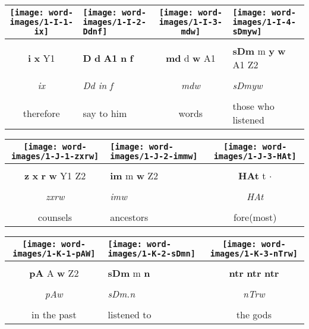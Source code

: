 \begin{tabularx}{\linewidth}{cYcY}
	\hspace*{-2mm}\texttt{[image: word-images/1-I-1-ix]} &
	\hspace*{-15mm} \texttt{[image: word-images/1-I-2-Ddnf]} &
	\hspace*{-13mm}\texttt{[image: word-images/1-I-3-mdw]} &
	\hspace*{-6mm} \texttt{[image: word-images/1-I-4-sDmyw]} \\
	\hline \\ 
	\textbf{i} \textbf{x} Y1 &
	\hspace*{-4mm} \textbf{D} \textbf{d} \textbf{A1} \textbf{n} \textbf{f} &
	\textbf{md} d \textbf{w} A1 &
	\textbf{sDm} m \textbf{y} \textbf{w} A1 Z2 \\
	\hline \\ 
	\textit{ix} & \hspace*{-4mm} \textit{Dd in f} & \textit{mdw} & \textit{sDmyw} \\
	\hline \\ 
	therefore & \hspace*{-4mm} say to him & words & \hspace*{-4mm} those who listened
\end{tabularx}

\vspace{7.5mm}

\begin{tabularx}{\linewidth}{cYc}
	\texttt{[image: word-images/1-J-1-zxrw]} &
	\texttt{[image: word-images/1-J-2-immw]} &
	\texttt{[image: word-images/1-J-3-HAt]} \\
	\hline \\ 
	\textbf{z} \textbf{x} \textbf{r} \textbf{w} Y1 Z2 &
	\textbf{im} m \textbf{w} Z2 &
	\textbf{HAt} t $\cdot$ \\
	\hline \\ 
	\textit{zxrw} & \textit{imw} & \textit{HAt} \\
	\hline \\ 
	counsels & ancestors & fore(most)
\end{tabularx}

\vspace{7.5mm}

\begin{tabularx}{\linewidth}{cYc}
	\texttt{[image: word-images/1-K-1-pAW]} &
	\texttt{[image: word-images/1-K-2-sDmn]} &
	\texttt{[image: word-images/1-K-3-nTrw]} \\
	\hline \\ 
	\textbf{pA} A \textbf{w} Z2 &
	\textbf{sDm} m \textbf{n} &
	\textbf{ntr} \textbf{ntr} \textbf{ntr} \\
	\hline \\ 
	\textit{pAw} & \textit{sDm.n} & \textit{nTrw} \\
	\hline \\ 
	in the past & listened to & the gods
\end{tabularx}

